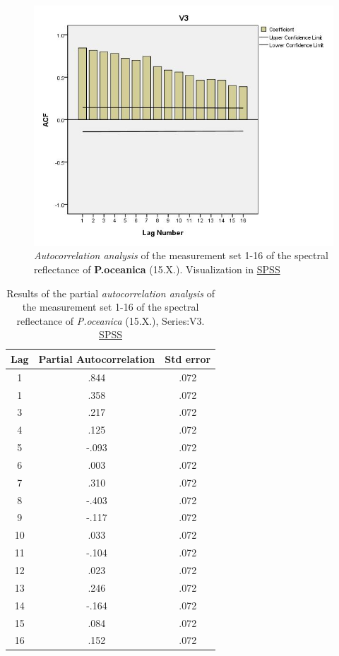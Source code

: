 \documentclass[10pt, a4paper]{article}
\begin{document}
\begin{appendices}
\begin{figure}[H]
	\centering
	\includegraphics[scale=0.45]{Autocorr.jpg}
	\caption{\textit{Autocorrelation analysis} of the measurement set 1-16 of the spectral reflectance of \textbf{P.oceanica} (15.X.). Visualization in \href{http://www.spss.com/}{SPSS}}
	\label{fig:A.21}
\end{figure}
\pagebreak
\newpage

\begin{table}[htbp]
	\caption{Results of the partial \textit{autocorrelation analysis} of the measurement set 1-16 of the spectral reflectance of \textit{P.oceanica} (15.X.), Series:V3. \href{http://www.spss.com/}{SPSS}}\label{tab:14}
	\begin{center}
	\begin{tabular}{|c|c|c|}
		\hline\hline
			Lag & Partial Autocorrelation & Std error\\ \hline\hline
			1 & .844 & .072 \\ \hline
			1 &.358 & .072 \\ \hline
			3 & .217 &.072 \\ \hline
			4 & .125 &.072 \\ \hline
			5 & -.093 & .072 \\ \hline
			6 & .003 & .072 \\ \hline
			7 & .310 & .072 \\ \hline
			8 & -.403 & .072 \\ \hline
			9 & -.117 & .072 \\ \hline
			10 & .033 & .072 \\ \hline
			11 & -.104 & .072 \\ \hline
			12 & .023 &.072 \\ \hline
			13 & .246 &.072 \\ \hline
			14 & -.164 & .072 \\ \hline
			15 & .084 & .072 \\ \hline
			16 & .152 & .072 \\ \hline
	\end{tabular}
	\end{center}
\end{table}


\end{appendices}
\end{document}
